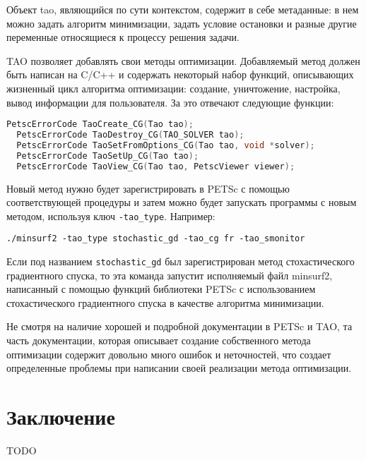 \documentclass[12pt]{report}
\begin{document}
  Объект tao, являющийся по сути контекстом, содержит в себе метаданные: в нем
  можно задать алгоритм минимизации, задать условие остановки и разные другие
  переменные относящиеся к процессу решения задачи.

  TAO позволяет добавлять свои методы оптимизации. Добавляемый метод должен быть
  написан на C/C++ и содержать некоторый набор функций, описывающих жизненный цикл
  алгоритма оптимизации: создание, уничтожение, настройка, вывод информации для
  пользователя. За это отвечают следующие функции:
  \begin{lstlisting}[language=C, frame=single]
  PetscErrorCode TaoCreate_CG(Tao tao);
  PetscErrorCode TaoDestroy_CG(TAO_SOLVER tao);
  PetscErrorCode TaoSetFromOptions_CG(Tao tao, void *solver);
  PetscErrorCode TaoSetUp_CG(Tao tao);
  PetscErrorCode TaoView_CG(Tao tao, PetscViewer viewer);
  \end{lstlisting}

  Новый метод нужно будет зарегистрировать в PETSc с помощью соответствующей
  процедуры и затем можно будет запускать программы с новым методом, используя
  ключ \verb|-tao_type|. Например:

  \verb|./minsurf2 -tao_type stochastic_gd -tao_cg fr -tao_smonitor|

  Если под названием \verb|stochastic_gd| был зарегистрирован метод стохастического
  градиентного спуска, то эта команда запустит исполняемый файл minsurf2,
  написанный с помощью функций библиотеки PETSc с использованием стохастического
  градиентного спуска в качестве алгоритма минимизации.

  Не смотря на наличие хорошей и подробной документации в PETSc и TAO, та часть
  документации, которая описывает создание собственного метода оптимизации содержит
  довольно много ошибок и неточностей, что создает определенные проблемы при
  написании своей реализации метода оптимизации.

  \chapter*{Заключение}
  {TODO}
\end{document}
